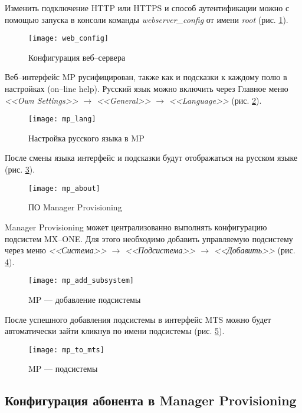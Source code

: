 Изменить подключение HTTP или HTTPS и способ аутентификации можно с помощью запуска в консоли команды {\em webserver\_config} от имени {\em root} (рис. \ref{img:web_config}).

\begin{figure}[!ht]
  \center
  \texttt{[image: web\_config]}
  \caption{Конфигурация веб--сервера}
  \label{img:web_config}
\end{figure}
\clearpage

Веб--интерфейс MP русифицирован, также как и подсказки к каждому полю в настройках (on--line help).
Русский язык можно включить через Главное меню {\em <<Own Settings>> $\rightarrow$ <<General>> $\rightarrow$ <<Language>>}
(рис. \ref{img:mp_lang}).
\begin{figure}[!ht]
  \center
  \texttt{[image: mp\_lang]}
  \caption{Настройка русского языка в MP}
  \label{img:mp_lang}
\end{figure}

После смены языка интерфейс и подсказки будут отображаться на русском языке (рис. \ref{img:mp_about}).
\begin{figure}[!ht]
  \center
  \texttt{[image: mp\_about]}
  \caption{ПО Manager Provisioning}
  \label{img:mp_about}
\end{figure}

Manager Provisioning может централизованно выполнять конфигурацию подсистем MX--ONE. Для этого необходимо добавить управляемую подсистему через меню {\em <<Система>> $\rightarrow$ <<Подсистема>> $\rightarrow$ <<Добавить>>} (рис. \ref{img:mp_add_subsystem}).
\begin{figure}[!ht]
  \center
  \texttt{[image: mp\_add\_subsystem]}
  \caption{MP --- добавление подсистемы}
  \label{img:mp_add_subsystem}
\end{figure}

После успешного добавления подсистемы в интерфейс MTS можно будет автоматически зайти кликнув по имени подсистемы (рис. \ref{img:mp_to_mts}).
\begin{figure}[!ht]
  \center
  \texttt{[image: mp\_to\_mts]}
  \caption{MP --- подсистемы}
  \label{img:mp_to_mts}
\end{figure}
\clearpage


\subsection{Конфигурация абонента в Manager Provisioning}

